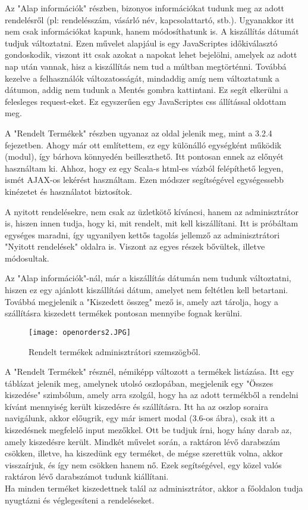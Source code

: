 Az "Alap információk" részben, bizonyos információkat tudunk meg az adott rendelésről (pl: rendelésszám, vásárló név, kapcsolattartó, stb.). Ugyanakkor itt nem csak információkat kapunk, hanem módosíthatunk is. A kiszállítás dátumát tudjuk változtatni. Ezen művelet alapjául is egy JavaScriptes időkiválasztó gondoskodik, viszont itt csak azokat a napokat lehet bejelölni, amelyek az adott nap után vannak, hisz a kiszállítás nem tud a múltban megtörténni. Továbbá kezelve a felhasználók változatosságát, mindaddig amíg nem változtatunk a dátumon, addig nem tudunk a Mentés gombra kattintani. Ez segít elkerülni a felesleges request-eket. Ez egyszerűen egy JavaScriptes css állítással oldottam meg.

A "Rendelt Termékek" részben ugyanaz az oldal jelenik meg, mint a 3.2.4 fejezetben. Ahogy már ott említettem, ez egy különálló egységként működik (modul), így bárhova könnyedén beilleszthető. Itt pontosan ennek az előnyét használtam ki. Ahhoz, hogy ez egy Scala-s html-es vázból felépíthető legyen, ismét AJAX-os lekérést használtam. Ezen módszer segítségével egységessebb kinézetet és használatot biztosítok.

A nyitott rendelésekre, nem csak az üzletkötő kíváncsi, hanem az adminisztrátor is, hiszen innen tudja, hogy ki, mit rendelt, mit kell kiszállítani. Itt is próbáltam egységes maradni, így ugyanilyen kettős tagolás jellemző az adminisztrátori "Nyitott rendelések" oldalra is. Viszont az egyes részek bővültek, illetve módosultak.

Az "Alap információk"-nál, már a kiszállítás dátumán nem tudunk változtatni, hiszen ez egy ajánlott kiszállítási dátum, amelyet nem feltétlen kell betartani. Továbbá megjelenik a "Kiszedett összeg" mező is, amely azt tárolja, hogy a szállításra kiszedett termékek pontosan mennyibe fognak kerülni. \newpage
\begin{figure}[h]
    \centering
    \texttt{[image: openorders2.JPG]}
    \caption{Rendelt termékek adminisztrátori szemszögből.}
\end{figure}
A "Rendelt Termékek" résznél, némiképp változott a termékek listázása. Itt egy táblázat jelenik meg, amelynek utolsó oszlopában, megjelenik egy "Összes kiszedése" szimbólum, amely arra szolgál, hogy ha az adott termékből a rendelni kívánt mennyiség került kiszedésre és szállításra. Itt ha az oszlop soraira navigálunk, akkor előugrik, egy már ismert modal (3.6-os ábra), csak itt a kiszedésnek megfelelő input mezőkkel. Ott be tudjuk írni, hogy hány darab az, amely kiszedésre került. Mindkét művelet során, a raktáron lévő darabszám csökken, illetve, ha kiszedünk egy terméket, de mégse szerettük volna, akkor visszaírjuk, és így nem csökken hanem nő. Ezek segítségével, egy közel valós raktáron lévő darabszámot tudunk kiállítani. \\
Ha minden terméket kiszedettnek talál az adminisztrátor, akkor a főoldalon tudja nyugtázni és véglegesíteni a rendeléseket.

